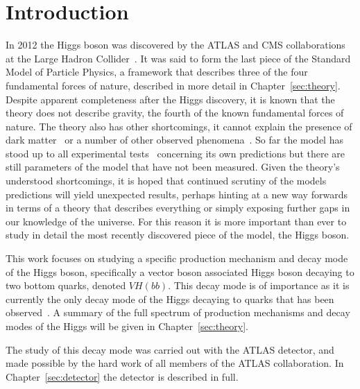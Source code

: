 \chapter{Introduction}%
\label{sec:intro}

In 2012 the Higgs boson was discovered by the ATLAS and CMS collaborations at
the Large Hadron Collider~\cite{DiscoHiggsATLAS, DiscoHiggsCMS}. It was said to
form the last piece of the Standard Model of Particle Physics, a framework that
describes three of the four fundamental forces of nature, described in more
detail in Chapter~\ref{sec:theory}. Despite apparent completeness after the
Higgs discovery, it is known that the theory does not describe gravity, the
fourth of the known fundamental forces of nature. The theory also has other
shortcomings, it cannot explain the presence of dark matter~\cite{DM-ev-sloan,
  DM-ev-nucleosynth, DM-ev-supernova, DM-ev-scaffold, DM-ev-direct,
  DM-ev-strong-lens, DM-ev-candidates, DM-ev-PDG, DM-ev-Zwicky,
  DM-ev-nonbaryonic, DM-ev-particle} or a number of other observed
phenomena~\cite{anom-BD-branching, anom-Dtau-excess, anom-g-2,
  anom-proton-radius, anom-bsll-trans}. So far the model has stood up to all
experimental tests~\cite{EWtests, 1998-SMtests} concerning its own predictions
but there are still parameters of the model that have not been measured. Given
the theory's understood shortcomings, it is hoped that continued scrutiny of the
models predictions will yield unexpected results, perhaps hinting at a new
way forwards in terms of a theory that describes everything or simply exposing
further gaps in our knowledge of the universe. For this reason it is more
important than ever to study in detail the most recently discovered piece of the
model, the Higgs boson.

This work focuses on studying a specific production mechanism and decay mode of
the Higgs boson, specifically a vector boson associated Higgs boson decaying to
two bottom quarks, denoted $VH(bb)$. This decay mode is of importance as it is
currently the only decay mode of the Higgs decaying to quarks that has been
observed~\cite{vhbb-obs}. A summary of the full spectrum of production
mechanisms and decay modes of the Higgs will be given in
Chapter~\ref{sec:theory}.

The study of this decay mode was carried out with the ATLAS detector, and made
possible by the hard work of all members of the ATLAS collaboration. In
Chapter~\ref{sec:detector} the detector is described in full.

